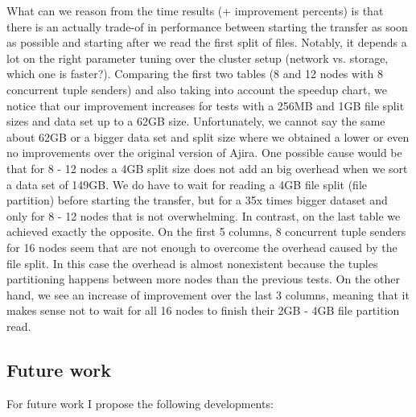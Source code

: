 What can we reason from the time results (+ improvement percents) is that there is an actually trade-of in performance between starting the transfer as soon as possible and starting after we read the first split of files. Notably, it depends a lot on the right parameter tuning over the cluster setup (network vs. storage, which one is faster?). Comparing the first two tables (8 and 12 nodes with 8 concurrent tuple senders) and also taking into account the speedup chart, we notice that our improvement increases for  tests with a 256MB and 1GB file split sizes and data set up to a 62GB size. Unfortunately, we cannot say the same about 62GB or a bigger data set and split size where we obtained a lower or even no improvements over the original version of Ajira. One possible cause would be that for 8 - 12 nodes a 4GB split size does not add an big overhead when we sort a data set of 149GB. We do have to wait for reading a 4GB file split (file partition) before starting the transfer, but for a 35x times bigger dataset and only for 8 - 12 nodes that is not overwhelming. In contrast, on the last table we achieved exactly the opposite. On the first 5 columns, 8 concurrent tuple senders for 16 nodes seem that are not enough to overcome the overhead caused by the file split. In this case the overhead is almost nonexistent because the tuples partitioning happens between more nodes than the previous tests. On the other hand, we see an increase of improvement over the last 3 columns, meaning that it makes sense not to wait for all 16 nodes to finish their 2GB - 4GB file partition read. 

\subsection{Future work}

For future work I propose the following developments:

